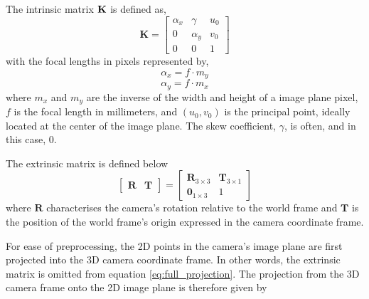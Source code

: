         The intrinsic matrix \(\bf{K}\) is defined as,
        \begin{equation} \label{eq:intrinsic}
            \bm{K} =
            \begin{bmatrix}
                \alpha_x & \gamma   & u_0 \\
                0        & \alpha_y & v_0 \\
                0        & 0        & 1
            \end{bmatrix}
        \end{equation}
        with the focal lengths in pixels represented by,
        \[\alpha_x = f \cdot m_y\]
        \[\alpha_y = f \cdot m_x\]
        where \(m_x\) and \(m_y\) are the inverse of the width and height of a image plane pixel, \(f\) is the focal length in millimeters, and \((u_0,v_0)\) is the principal point, ideally located at the center of the image plane. The skew coefficient, \(\gamma\), is often, and in this case, 0.

        The extrinsic matrix is defined below
        \begin{equation}\label{eq:extrinsic}
            \begin{bmatrix}
                \bm{R} & \bm{T}
            \end{bmatrix}
            =
            \begin{bmatrix}
                \bm{R}_{3\times3} & \bm{T}_{3\times1} \\
                \bm{0}_{1\times3} & 1
            \end{bmatrix}
        \end{equation}
        where \(\bm{R}\) characterises the camera's rotation relative to the world frame and \(\bm{T}\) is the position of the world frame's origin expressed in the camera coordinate frame.

        For ease of preprocessing, the 2D points in the camera's image plane are first projected into the 3D camera coordinate frame. In other words, the extrinsic matrix is omitted from equation \ref{eq:full_projection}. The projection from the 3D camera frame onto the 2D image plane is therefore given by

